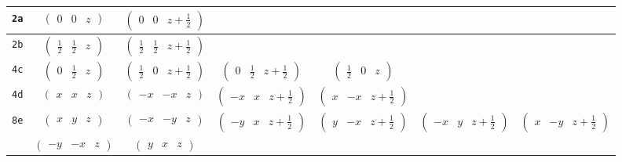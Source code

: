 \documentclass[fleqn,9pt,landscape]{jsarticle}
\begin{document}
\begin{center}
\begin{longtable}{ccccccc}
{\tt 2a} & $ \begin{pmatrix} 0 & 0 & z \end{pmatrix} $ & $ \begin{pmatrix} 0 & 0 & z + \frac{1}{2} \end{pmatrix} $ & $  $ & $  $ & $  $ & $  $ \\ \hline
{\tt 2b} & $ \begin{pmatrix} \frac{1}{2} & \frac{1}{2} & z \end{pmatrix} $ & $ \begin{pmatrix} \frac{1}{2} & \frac{1}{2} & z + \frac{1}{2} \end{pmatrix} $ & $  $ & $  $ & $  $ & $  $ \\ \hline
{\tt 4c} & $ \begin{pmatrix} 0 & \frac{1}{2} & z \end{pmatrix} $ & $ \begin{pmatrix} \frac{1}{2} & 0 & z + \frac{1}{2} \end{pmatrix} $ & $ \begin{pmatrix} 0 & \frac{1}{2} & z + \frac{1}{2} \end{pmatrix} $ & $ \begin{pmatrix} \frac{1}{2} & 0 & z \end{pmatrix} $ & $  $ & $  $ \\ \hline
{\tt 4d} & $ \begin{pmatrix} x & x & z \end{pmatrix} $ & $ \begin{pmatrix} - x & - x & z \end{pmatrix} $ & $ \begin{pmatrix} - x & x & z + \frac{1}{2} \end{pmatrix} $ & $ \begin{pmatrix} x & - x & z + \frac{1}{2} \end{pmatrix} $ & $  $ & $  $ \\ \hline
{\tt 8e} & $ \begin{pmatrix} x & y & z \end{pmatrix} $ & $ \begin{pmatrix} - x & - y & z \end{pmatrix} $ & $ \begin{pmatrix} - y & x & z + \frac{1}{2} \end{pmatrix} $ & $ \begin{pmatrix} y & - x & z + \frac{1}{2} \end{pmatrix} $ & $ \begin{pmatrix} - x & y & z + \frac{1}{2} \end{pmatrix} $ & $ \begin{pmatrix} x & - y & z + \frac{1}{2} \end{pmatrix} $ \\
& $ \begin{pmatrix} - y & - x & z \end{pmatrix} $ & $ \begin{pmatrix} y & x & z \end{pmatrix} $ & $  $ & $  $ & $  $ & $  $ \\
\end{longtable}
\end{center}
\end{document}

